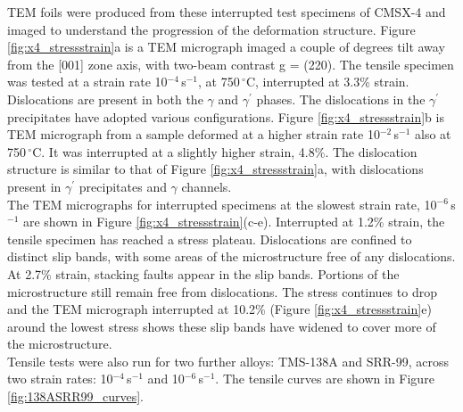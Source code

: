 \documentclass[a4paper,12pt,times,numbered,print,index]{Classes/PhDThesisPSnPDF}
\begin{document}
TEM foils were produced from these interrupted test specimens of CMSX-4 and imaged to understand the progression of the deformation structure. Figure \ref{fig:x4_stressstrain}a is a TEM micrograph imaged a couple of degrees tilt away from the [001] zone axis, with two-beam contrast g = (220). The tensile specimen was tested at a strain rate 10$^{-4}$\,s$^{-1}$, at 750\,$^\circ$C, interrupted at 3.3\% strain. Dislocations are present in both the $\gamma$ and $\gamma^\prime$ phases. The dislocations in the $\gamma^\prime$ precipitates have adopted various configurations. Figure \ref{fig:x4_stressstrain}b is TEM micrograph from a sample deformed at a higher strain rate 10$^{-2}$\,s$^{-1}$ also at 750\,$^\circ$C. It was interrupted at a slightly higher strain, 4.8\%. The dislocation structure is similar to that of Figure \ref{fig:x4_stressstrain}a, with dislocations present in $\gamma^\prime$ precipitates and $\gamma$ channels.\\
The TEM micrographs for interrupted specimens at the slowest strain rate, 10$^{-6}$\,s$^{-1}$ are shown in Figure \ref{fig:x4_stressstrain}(c-e). Interrupted at 1.2\% strain, the tensile specimen has reached a stress plateau. Dislocations are confined to distinct slip bands, with some areas of the microstructure free of any dislocations. At 2.7\% strain, stacking faults appear in the slip bands. Portions of the microstructure still remain free from dislocations. The stress continues to drop and the TEM micrograph interrupted at 10.2\% (Figure \ref{fig:x4_stressstrain}e) around the lowest stress shows these slip bands have widened to cover more of the microstructure.\\%
Tensile tests were also run for two further alloys: TMS-138A and SRR-99, across two strain rates: 10$^{-4}$\,s$^{-1}$ and 10$^{-6}$\,s$^{-1}$. The tensile curves are shown in Figure \ref{fig:138ASRR99_curves}. 
\end{document}
